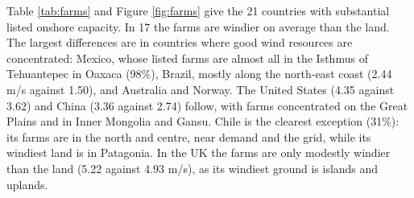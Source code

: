 \documentclass[11pt,a4paper]{article}
\begin{document}
Table \ref{tab:farms} and Figure \ref{fig:farms} give the 21 countries with substantial listed onshore capacity. In 17 the farms are windier on average than the land. The largest differences are in countries where good wind resources are concentrated: Mexico, whose listed farms are almost all in the Isthmus of Tehuantepec in Oaxaca (98\%), Brazil, mostly along the north-east coast (2.44 m/s against 1.50), and Australia and Norway. The United States (4.35 against 3.62) and China (3.36 against 2.74) follow, with farms concentrated on the Great Plains and in Inner Mongolia and Gansu. Chile is the clearest exception (31\%): its farms are in the north and centre, near demand and the grid, while its windiest land is in Patagonia. In the UK the farms are only modestly windier than the land (5.22 against 4.93 m/s), as its windiest ground is islands and uplands.
\end{document}
